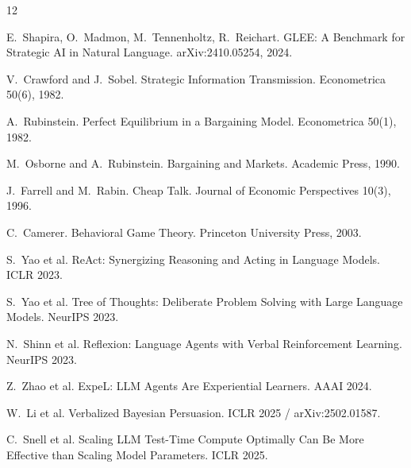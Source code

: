 \documentclass{article}
\begin{document}
\begin{thebibliography}{12}\small

E.~Shapira, O.~Madmon, M.~Tennenholtz, R.~Reichart.
\newblock GLEE: A Benchmark for Strategic AI in Natural Language.
\newblock arXiv:2410.05254, 2024.

V.~Crawford and J.~Sobel.
\newblock Strategic Information Transmission.
\newblock Econometrica 50(6), 1982.

A.~Rubinstein.
\newblock Perfect Equilibrium in a Bargaining Model.
\newblock Econometrica 50(1), 1982.

M.~Osborne and A.~Rubinstein.
\newblock Bargaining and Markets.
\newblock Academic Press, 1990.

J.~Farrell and M.~Rabin.
\newblock Cheap Talk.
\newblock Journal of Economic Perspectives 10(3), 1996.

C.~Camerer.
\newblock Behavioral Game Theory.
\newblock Princeton University Press, 2003.

S.~Yao et al.
\newblock ReAct: Synergizing Reasoning and Acting in Language Models.
\newblock ICLR 2023.

S.~Yao et al.
\newblock Tree of Thoughts: Deliberate Problem Solving with Large Language Models.
\newblock NeurIPS 2023.

N.~Shinn et al.
\newblock Reflexion: Language Agents with Verbal Reinforcement Learning.
\newblock NeurIPS 2023.

Z.~Zhao et al.
\newblock ExpeL: LLM Agents Are Experiential Learners.
\newblock AAAI 2024.

W.~Li et al.
\newblock Verbalized Bayesian Persuasion.
\newblock ICLR 2025 / arXiv:2502.01587.

C.~Snell et al.
\newblock Scaling LLM Test-Time Compute Optimally Can Be More Effective than Scaling Model Parameters.
\newblock ICLR 2025.

\end{thebibliography}

\appendix
\end{document}
